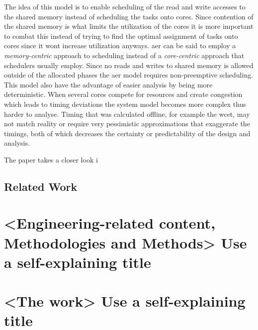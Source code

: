 \documentclass{kththesis}
\begin{document}
The idea of this model is to enable scheduling of the read and write accesses to the shared memory
instead of scheduling the tasks onto cores. Since contention of the shared memory is what limits the
utilization of the cores it is more important to combat this instead of trying to find the optimal
assignment of tasks onto cores since it wont increase utilization anyways. \acrshort{aer} can be
said to employ a \textit{memory-centric} approach to scheduling instead of a \textit{core-centric}
approach that schedulers usually employ. Since no reads and writes to shared memory is allowed
outside of the allocated phases the \acrfull{aer} model requires non-preemptive scheduling. This
model also have the advantage of easier analysis by being more deterministic. When several cores
compete for resources and create congestion which leads to timing deviations the system model
becomes more complex thus harder to analyse. Timing that was calculated offline, for example the
\acrshort{wcet}, may not match reality or require very pessimistic approximations that exaggerate
the timings, both of which decreases the certainty or predictability of the design and analysis.



The paper \parencite{maia_closer_2016} takes a closer look i

\section{Related Work}

\chapter{<Engineering-related content, Methodologies and Methods> Use a self-explaining title}


\chapter{<The work> Use a self-explaining title}
\end{document}
